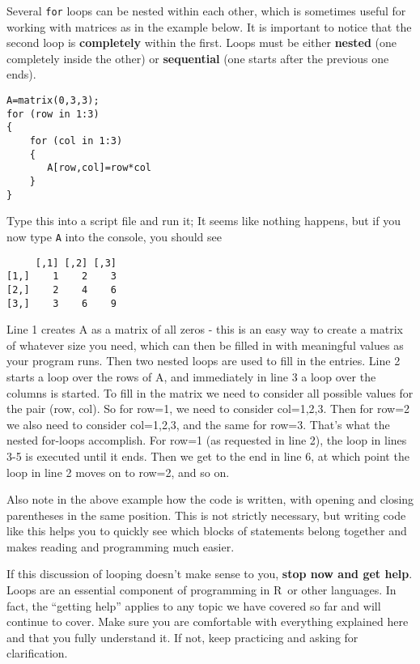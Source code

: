 \documentclass [11pt]{article}
\newcommand{\code}[1]{{\tt #1}}
\newcommand\R{{\sf R}}
\numberwithin{exercise}{section}
\begin{document}
Several \texttt{for} loops can be nested within each other, which is sometimes useful for working with matrices as in the example below. It is important to notice 
that the second loop is \textbf{completely }within the first. Loops must be  either \textbf{nested} (one completely inside the other) or 
\textbf{sequential} (one starts after the previous one ends). 
\begin{verbatim}
A=matrix(0,3,3);                  
for (row in 1:3) 
{                
	for (col in 1:3) 
    {          
       A[row,col]=row*col      
    }                           
}                                 
\end{verbatim} 
Type this into a script file and run it; It seems like nothing happens, but if you now type \code{A} into the console, you should see
\begin{verbatim}
     [,1] [,2] [,3]
[1,]    1    2    3
[2,]    2    4    6
[3,]    3    6    9
\end{verbatim}

Line 1 creates A as a matrix of all zeros - this is an easy way to create a 
matrix of whatever size you need, which can then be filled in with 
meaningful values as your program runs. Then two nested loops are 
used to fill in the entries. Line 2 starts a loop over the rows of A, and 
immediately in line 3 a loop over the columns is started. To 
fill in the matrix we need to consider all possible values for the pair 
(row, col). So for row=1, we need to consider col=1,2,3. Then for 
row=2 we also need to consider col=1,2,3, and the same for row=3. That's 
what the nested for-loops accomplish. For row=1 (as requested in line 2), 
the loop in lines 3-5 is executed until it ends. Then we get to the end in 
line 6, at which point the loop in line 2 moves on to row=2, and so on. 

Also note in the above example how the code is written, with opening and closing parentheses in the same position. 
This is not strictly necessary, but writing code like this helps you to quickly see which blocks of statements belong together and makes reading and programming much easier.

If this discussion of looping doesn't make sense to you, \textbf{stop now and get help}. Loops are an essential component of programming in \R\ or other languages. In fact, the ``getting help'' applies to any topic we have covered so far and will continue to cover. 
Make sure you are comfortable with everything explained here and that you fully understand it. 
If not, keep practicing and asking for clarification. 
\end{document}
